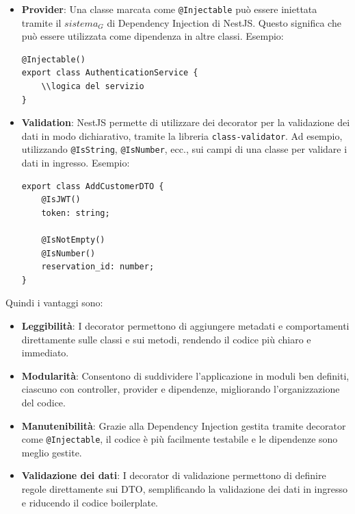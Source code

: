 \begin{itemize}
\item \textbf{Provider}: Una classe marcata come \texttt{@Injectable} può essere iniettata tramite il $\textit{sistema}_G$ di Dependency Injection di NestJS. Questo significa che può essere utilizzata come dipendenza in altre classi. Esempio:

\begin{lstlisting}[style=ES6]
@Injectable()
export class AuthenticationService {
    \\logica del servizio
}
\end{lstlisting}

\item \textbf{Validation}: NestJS permette di utilizzare dei decorator per la validazione dei dati in modo dichiarativo, tramite la libreria \texttt{class-validator}. Ad esempio, utilizzando \texttt{@IsString}, \texttt{@IsNumber}, ecc., sui campi di una classe per validare i dati in ingresso. Esempio:

\begin{lstlisting}[style=ES6]
export class AddCustomerDTO {   
    @IsJWT()
    token: string; 

    @IsNotEmpty()
    @IsNumber()
    reservation_id: number;
}
\end{lstlisting}

\end{itemize}

\newpage
Quindi i vantaggi sono: 
\begin{itemize}
\item \textbf{Leggibilità}: I decorator permettono di aggiungere metadati e comportamenti direttamente sulle classi e sui metodi, rendendo il codice più chiaro e immediato.
\item \textbf{Modularità}: Consentono di suddividere l'applicazione in moduli ben definiti, ciascuno con controller, provider e dipendenze, migliorando l'organizzazione del codice.
\item \textbf{Manutenibilità}: Grazie alla Dependency Injection gestita tramite decorator come \texttt{@Injectable}, il codice è più facilmente testabile e le dipendenze sono meglio gestite.
\item \textbf{Validazione dei dati}: I decorator di validazione permettono di definire regole direttamente sui DTO, semplificando la validazione dei dati in ingresso e riducendo il codice boilerplate.
\end{itemize}


